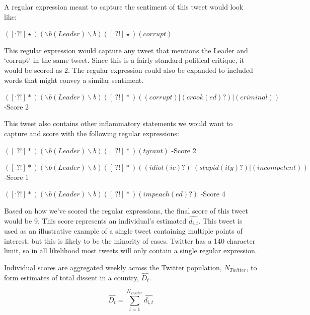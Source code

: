 \documentclass[12pt]{article}
\begin{document}
\begin{spacing}{1.5}
\noindent A regular expression meant to capture the sentiment of this tweet would look like:

\begin{center}
$([^.?!]\star)(\backslash b(Leader)\backslash b)([^.?!]\star)(corrupt)$
\end{center}

\noindent This regular expression would capture any tweet that mentions the Leader and `corrupt' in the same tweet. Since this is a fairly standard political critique, it would be scored as 2. The regular expression could also be expanded to included words that might convey a similar sentiment.

\begin{center}
$([^.?!]*) (\backslash b(Leader)\backslash b)([^.?!]*)((corrupt)|(crook(ed)?)|(criminal))$ -Score 2
\end{center}

\noindent This tweet also contains other inflammatory statements we would want to capture and score with the following regular expressions:  

\vspace{.5 em}

\begin{center}
$([^.?!]*)(\backslash b(Leader)\backslash b)([^.?!]*)(tyrant)$ -Score 2

\vspace{.5 em}
$([^.?!]*) (\backslash b(Leader)\backslash b)([^.?!]*)((idiot(ic)?)|(stupid(ity)?)|(incompetent))$ -Score 1

\vspace{.5 em}
$([^.?!]*)(\backslash b(Leader)\backslash b)([^.?!]*)(impeach(ed)?)$ -Score 4
\end{center}

\noindent Based on how we've scored the regular expressions, the final score of this tweet would be 9. This score represents an individual's estimated $\hat{d_{i,t}}$. This tweet is used as an illustrative example of a single tweet containing multiple points of interest, but this is likely to be the minority of cases. Twitter has a 140 character limit, so in all likelihood most tweets will only contain a single regular expression.  

Individual scores are aggregated weekly across the Twitter population, $N_{Twitter}$, to form estimates of total dissent in a country, $\hat{D_t}$. 

\vspace{.5 em}
\begin{equation}
\hat{D_t}= \sum_{i=1}^{N_{Twitter}} \hat{d_{i,t}} 	
\end{equation}


\end{spacing}
\end{document}
